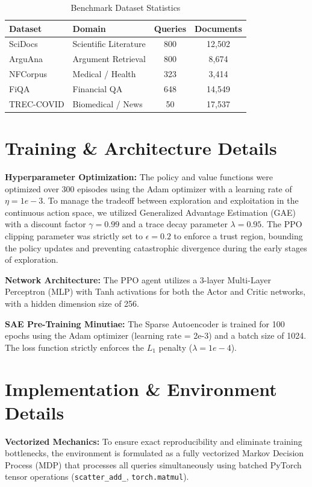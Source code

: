 \documentclass[sigconf]{acmart}
\begin{document}
\begin{table}[t]
  \caption{Benchmark Dataset Statistics}
  \label{tab:datasets}
  \begin{tabular}{llcc}
    \toprule
    Dataset & Domain & Queries & Documents\\
    \midrule
    SciDocs & Scientific Literature & 800 & 12,502\\
    ArguAna & Argument Retrieval & 800 & 8,674\\
    NFCorpus & Medical / Health & 323 & 3,414\\
    FiQA & Financial QA & 648 & 14,549\\
    TREC-COVID & Biomedical / News & 50 & 17,537\\
    \bottomrule
  \end{tabular}
\end{table}

\section{Training \& Architecture Details}

\textbf{Hyperparameter Optimization:} The policy and value functions were optimized over 300 episodes using the Adam optimizer with a learning rate of $\eta = 1e-3$. To manage the tradeoff between exploration and exploitation in the continuous action space, we utilized Generalized Advantage Estimation (GAE) with a discount factor $\gamma = 0.99$ and a trace decay parameter $\lambda = 0.95$. The PPO clipping parameter was strictly set to $\epsilon = 0.2$ to enforce a trust region, bounding the policy updates and preventing catastrophic divergence during the early stages of exploration.

\textbf{Network Architecture:} The PPO agent utilizes a 3-layer Multi-Layer Perceptron (MLP) with Tanh activations for both the Actor and Critic networks, with a hidden dimension size of 256.

\textbf{SAE Pre-Training Minutiae:} The Sparse Autoencoder is trained for 100 epochs using the Adam optimizer (learning rate = 2e-3) and a batch size of 1024. The loss function strictly enforces the $L_1$ penalty ($\lambda = 1e-4$).

\section{Implementation \& Environment Details}

\textbf{Vectorized Mechanics:} To ensure exact reproducibility and eliminate training bottlenecks, the environment is formulated as a fully vectorized Markov Decision Process (MDP) that processes all queries simultaneously using batched PyTorch tensor operations (\texttt{scatter\_add\_}, \texttt{torch.matmul}).
\end{document}
